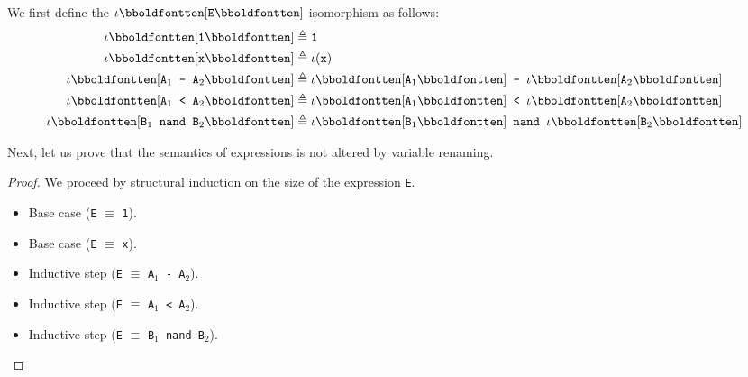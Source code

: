 %
\begin{answer}
  We first define the $\vren{\texttt{E}}$ isomorphism as follows:
  \begin{align*}
    \vren{\texttt{1}} &\isDefAs \texttt{1}\\
    \vren{\texttt{x}} &\isDefAs \iota(\texttt{x})\\
    \vren{\texttt{A}_1\texttt{ - }\texttt{A}_2} &\isDefAs \vren{\texttt{A}_1}\texttt{ - }\vren{\texttt{A}_2}\\
    \vren{\texttt{A}_1\texttt{ < }\texttt{A}_2} &\isDefAs \vren{\texttt{A}_1}\texttt{ < }\vren{\texttt{A}_2}\\
    \vren{\texttt{B}_1\texttt{ nand }\texttt{B}_2} &\isDefAs \vren{\texttt{B}_1}\texttt{ nand }\vren{\texttt{B}_2}\\
  \end{align*}
  
  Next, let us prove that the semantics of expressions is not altered by
  variable renaming.
  \begin{proof}
    We proceed by structural induction on the size of the expression \texttt{E}.
    \begin{itemize}
    \item Base case (\texttt{E} $\equiv$ \texttt{1}).
    \item Base case (\texttt{E} $\equiv$ \texttt{x}).
    \item Inductive step (\texttt{E} $\equiv$ \texttt{A}$_1$\texttt{ - A}$_2$).
    \item Inductive step (\texttt{E} $\equiv$ \texttt{A}$_1$\texttt{ < A}$_2$).
    \item Inductive step (\texttt{E} $\equiv$ \texttt{B}$_1$\texttt{ nand B}$_2$).
    \end{itemize}
  \end{proof}
\end{answer}


